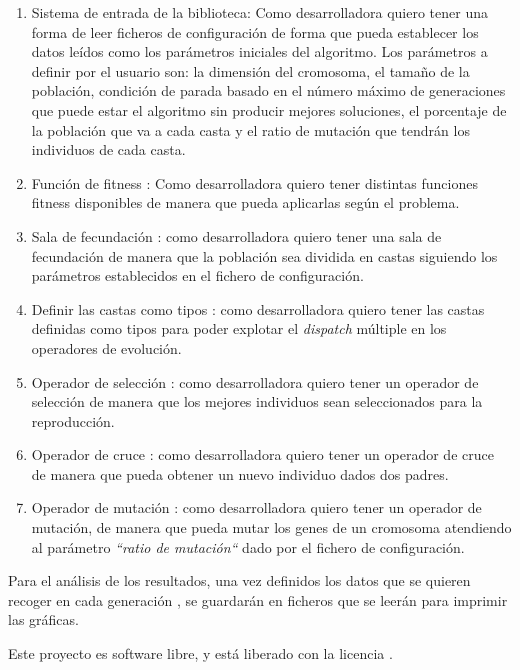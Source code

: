 \begin{enumerate}
    \item Sistema de entrada de la biblioteca: Como desarrolladora quiero tener una forma de leer ficheros de configuración de forma que pueda
    establecer los datos leídos como los parámetros iniciales del algoritmo. Los parámetros a definir por el usuario son: la dimensión del cromosoma, el tamaño de la población, 
    condición de parada basado en el número máximo de generaciones que puede estar el algoritmo sin producir mejores soluciones, el porcentaje de la población que va a cada casta y 
    el ratio de mutación que tendrán los individuos de cada casta.
    \item Función de fitness \cite{project_repository_8}: Como desarrolladora quiero tener distintas funciones fitness disponibles de manera que pueda aplicarlas según 
    el problema.
    \item Sala de fecundación \cite{project_repository_17}: como desarrolladora quiero tener una sala de fecundación de manera que la población sea dividida en castas siguiendo los parámetros establecidos
    en el fichero de configuración.
    \item Definir las castas como tipos \cite{project_repository_21}: como desarrolladora quiero tener las castas definidas como tipos para poder explotar el \emph{dispatch} múltiple en los operadores de evolución.
    \item Operador de selección \cite{project_repository_18}: como desarrolladora quiero tener un operador de selección de manera que los mejores individuos sean seleccionados para la reproducción.
    \item Operador de cruce \cite{project_repository_19}: como desarrolladora quiero tener un operador de cruce de manera que pueda obtener un nuevo individuo dados dos padres.
    \item Operador de mutación \cite{project_repository_20}: como desarrolladora quiero tener un operador de mutación, de manera que pueda mutar los genes de un cromosoma atendiendo al parámetro
    \emph{``ratio de mutación``} dado por el fichero de configuración. 
\end{enumerate}

Para el análisis de los resultados, una vez definidos los datos que se quieren recoger en cada generación \cite{pull_17}, se guardarán en ficheros que se leerán para imprimir las gráficas.

Este proyecto es software libre, y está liberado con la licencia \cite{gplv3}.
